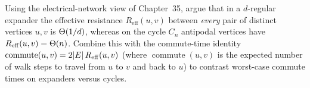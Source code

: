 \begin{exercise}
Using the electrical-network view of Chapter~35, argue that in a $d$-regular expander the effective resistance $R_{\mathrm{eff}}(u,v)$ between \emph{every} pair of distinct vertices $u,v$ is $\Theta(1/d)$, whereas on the cycle $C_n$ antipodal vertices have $R_{\mathrm{eff}}(u,v)=\Theta(n)$. Combine this with the commute-time identity $\operatorname{commute}(u,v)=2\lvert E\rvert\,R_{\mathrm{eff}}(u,v)$ (where $\operatorname{commute}(u,v)$ is the expected number of walk steps to travel from $u$ to $v$ and back to $u$) to contrast worst-case commute times on expanders versus cycles.
\end{exercise}
